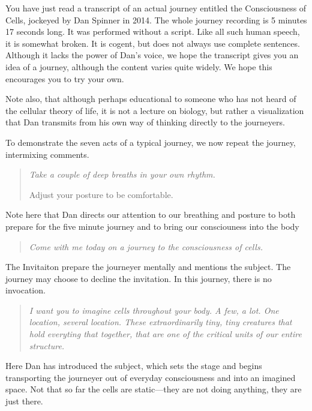 \documentclass[12pt]{book}
\begin{document}
\hrulefill



You have just read a transcript of an actual journey entitled the
Consciousness of Cells, jockeyed by Dan Spinner in 2014. The
whole journey recording is 5 minutes 17 seconds long. It was
performed without a script. Like all such human speech, it
is somewhat broken. It is cogent, but does not always
use complete sentences. Although it lacks the power of Dan's
voice, we hope the transcript gives you an idea of a journey,
although the content varies quite widely. We hope this
encourages you to try your own.

Note also, that although perhaps educational to someone
who has not heard of the cellular theory of life, it is not
a lecture on biology, but rather a visualization that Dan
transmits from his own way of thinking directly to the journeyers.

To demonstrate the seven acts of a typical journey, we
now repeat the journey, intermixing comments.


\hrulefill

\begin{quote}{\em
Take a couple of deep breaths in your own rhythm.

Adjust your posture to be comfortable.
}
\end{quote}

Note here that Dan directs our attention to our breathing
and posture to both prepare for the five minute journey
and to bring our consciouness into the body

\begin{quote}{\em
  Come with me today on a journey to the consciousness of cells.
}\end{quote}

The Invitaiton prepare the journeyer mentally and mentions
the subject. The journey may choose to decline the invitation.
In this journey, there is no invocation.
\begin{quote}{\em
I want you to imagine
cells throughout your body. A few, a lot. One location, several location.
These extraordinarily tiny, tiny creatures that
hold everyting that together, that
are one of the critical units of our entire structure.
}\end{quote}

Here Dan has introduced the subject, which sets the stage and
begins transporting the journeyer out of everyday consciousness
and into an imagined space. Not that so far the cells are
static---they are not doing anything, they are just there.
\end{document}
